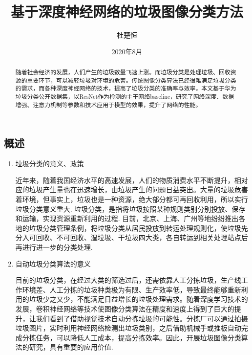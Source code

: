 \documentclass[a4paper]{article}
\title{基于深度神经网络的垃圾图像分类方法}
\author{杜楚恒}
\date{2020年8月}
\begin{document}
\begin{CJK*}{UTF8}{gbsn}

\maketitle

\renewcommand{\abstractname}{摘要}
\begin{abstract}
    随着社会经济的发展，人们产生的垃圾数量飞速上涨。而垃圾分类是处理垃圾、回收资源的重要环节，可以减轻垃圾对环境的危害。传统图像分类算法已经很难满足垃圾分类的需求，而各种深度神经网络的技术，提高了垃圾分类的准确率与效率。本文基于华为垃圾分类公开数据集，以ResNet作为检测的主干网络baseline，研究了网络深度、数据增强、注意力机制等参数和技术应用于模型的效果，提升了网络的性能。
\end{abstract}

\section{概述}
\begin{enumerate}
\item 垃圾分类的意义、政策

近年来，随着我国经济水平的高速发展，人们的物质消费水平不断提升，相对应的垃圾产生量也在迅速增长，由垃圾产生的问题日益突出。大量的垃圾危害着环境，但事实上，垃圾也是一种资源，绝大部分都可再回收利用，所以实行垃圾分类意义重大.
垃圾分类，是指将垃圾按照某种规则类别分别投放、保存和运输，实现资源重新利用的过程.
目前，北京、上海、广州等地纷纷推出各地的垃圾分类管理条例，将垃圾分类从居民投放到转运处理规则化，使垃圾先分入可回收、不可回收、湿垃圾、干垃圾四大类，各自转运到相关处理站点后再进行进一步的分类处理.

\item 自动垃圾分类算法的意义

目前的垃圾分类，在经过大类的筛选过后，还需依靠人工分拣垃圾，生产线工作环境差、人工分拣的垃圾种类极为有限、生产效率低，导致最终能够重新利用的垃圾少之又少，不能满足日益增长的垃圾处理需求。随着深度学习技术的发展，卷积神经网络等技术使图像分类算法在精度和速度上得到了巨大的提升，让我们看到了借助视觉技术自动分拣垃圾的可能性。分拣厂可以通过拍摄垃圾图片，实时利用神经网络检测出垃圾类别，之后借助机械手或推板自动完成分拣任务，可以降低人工成本，提高分拣效率。因此，开展垃圾图像分类算法的研究，具有重要的应用价值.

\end{enumerate}


\end{CJK*}
\end{document}
